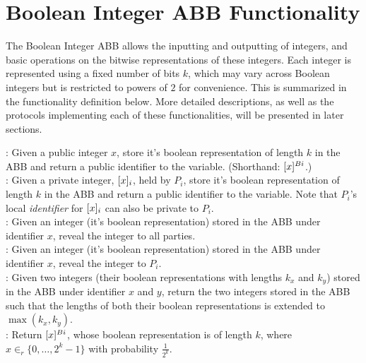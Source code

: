 \section{Boolean Integer ABB Functionality}


The Boolean Integer ABB allows the inputting and outputting of integers, and basic
operations on the bitwise representations of these integers. Each integer is 
represented using a fixed number of bits $k$, which may vary across Boolean 
integers but is restricted to powers of $2$ for convenience. This is summarized in
the functionality definition below. More detailed descriptions, as well as the 
protocols implementing each of these functionalities, will be presented in later sections.

\begin{functionality}
	
	: Given a public integer $x$, store it's boolean representation 
	of length $k$ in the ABB and return a public identifier to the variable. 
	(Shorthand: $[x]^{Bi}$.)\\
	
	:  Given a private integer, $[x]_{i}$, held by $P_i$,
	store it's boolean representation of length $k$ in the ABB and return a public identifier 
	to the variable. Note that $P_i$'s local \emph{identifier} for $[x]_{i}$ can 
	also be private to $P_i$. \\
	
	: Given an integer (it's boolean representation) stored in 
	the ABB under identifier $x$, reveal the integer to all parties. \\
	
	:  Given an integer (it's boolean representation) stored 
	in the ABB under identifier $x$, reveal the integer to $P_i$.  \\
	
	:  Given two integers (their boolean 
	representations with lengths $k_x$ and $k_y$) stored 
	in the ABB under identifier $x$ and $y$, return the two integers stored 
	in the ABB such that the lengths of both their boolean representations is 
	extended to $\max(k_x, k_y)$.  \\
	
	: Return $[x]^{Bi}$, whose boolean representation is of length $k$,
	where $x \in_r \{0,\ldots,2^k-1\}$ with probability $\frac{1}{2^k}$. \\
	

\end{functionality}
